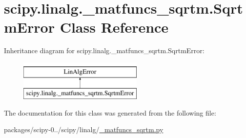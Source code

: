 \hypertarget{classscipy_1_1linalg_1_1__matfuncs__sqrtm_1_1SqrtmError}{}\section{scipy.\+linalg.\+\_\+matfuncs\+\_\+sqrtm.\+Sqrtm\+Error Class Reference}
\label{classscipy_1_1linalg_1_1__matfuncs__sqrtm_1_1SqrtmError}
Inheritance diagram for scipy.\+linalg.\+\_\+matfuncs\+\_\+sqrtm.\+Sqrtm\+Error\+:\begin{figure}[H]
\begin{center}
\leavevmode
\includegraphics[height=2.000000cm]{classscipy_1_1linalg_1_1__matfuncs__sqrtm_1_1SqrtmError}
\end{center}
\end{figure}


The documentation for this class was generated from the following file\+:\begin{DoxyCompactItemize}
\item 
packages/scipy-\/0../scipy/linalg/\hyperlink{__matfuncs__sqrtm_8py}{\+\_\+matfuncs\+\_\+sqrtm.\+py}\end{DoxyCompactItemize}
